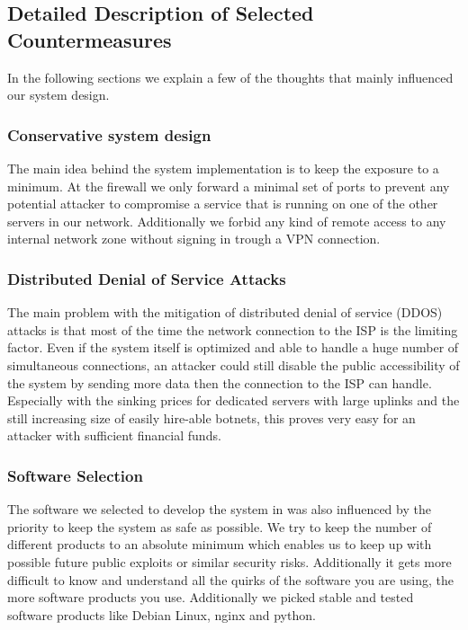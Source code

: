 \documentclass[a4paper, toc=index, 12pt, DIV14, twoside, BCOR2cm, headsepline, numbers=noenddot, bibliography=totoc]{scrbook}
\begin{document}
\subsection{Detailed Description of Selected Countermeasures}

In the following sections we explain a few of the thoughts that mainly influenced our system design.

\subsubsection{Conservative system design}
The main idea behind the system implementation is to keep the exposure to a minimum. At the firewall we only forward a minimal set of ports to prevent any potential attacker to compromise a service that is running on one of the other servers in our network. Additionally we forbid any kind of remote access to any internal network zone without signing in trough a VPN connection.\newline

\subsubsection{Distributed Denial of Service Attacks}
The main problem with the mitigation of distributed denial of service (DDOS) attacks is that most of the time the network connection to the ISP is the limiting factor. Even if the system itself is optimized and able to handle a huge number of simultaneous connections, an attacker could still disable the public accessibility of the system by sending more data then the connection to the ISP can handle. Especially with the sinking prices for dedicated servers with large uplinks and the still increasing size of easily hire-able botnets, this proves very easy for an attacker with sufficient financial funds.

\subsubsection{Software Selection}
The software we selected to develop the system in was also influenced by the priority to keep the system as safe as possible. We try to keep the number of different products to an absolute minimum which enables us to keep up with possible future public exploits or similar security risks. Additionally it gets more difficult to know and understand all the quirks of the software you are using, the more software products you use.\newline
Additionally we picked stable and tested software products like Debian Linux, nginx and python.
\end{document}
